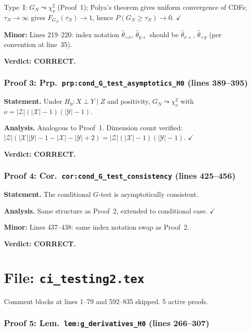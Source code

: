 \documentclass{article}
\begin{document}
Type~I: $G_N\leadsto\chi^2_\nu$ (Proof~1); Polya's theorem gives uniform
convergence of CDFs; $\tau_N\to\infty$ gives $F_{G_N}(\tau_N)\to 1$,
hence $P(G_N\ge\tau_N)\to 0$.  $\checkmark$

\textbf{Minor:} Lines 219--220: index notation $\hat\theta_{+x}$,
$\hat\theta_{y+}$ should be $\hat\theta_{x+}$, $\hat\theta_{+y}$
(per convention at line~35).

\textbf{Verdict: CORRECT.}

\section{Proof 3: Prp.\ \texttt{prp:cond\_G\_test\_asymptotics\_H0}
(lines 389--395)}

\textbf{Statement.} Under $H_0:X\perp Y\mid Z$ and positivity,
$G_N\leadsto\chi^2_\nu$ with $\nu=|\mathcal{Z}|(|\mathcal{X}|-1)(|\mathcal{Y}|-1)$.

\textbf{Analysis.}
Analogous to Proof~1.  Dimension count verified:
$|\mathcal{Z}|(|\mathcal{X}||\mathcal{Y}|-1-|\mathcal{X}|-|\mathcal{Y}|+2)
= |\mathcal{Z}|(|\mathcal{X}|-1)(|\mathcal{Y}|-1)$.  $\checkmark$

\textbf{Verdict: CORRECT.}

\section{Proof 4: Cor.\ \texttt{cor:cond\_G\_test\_consistency}
(lines 425--456)}

\textbf{Statement.} The conditional $G$-test is asymptotically consistent.

\textbf{Analysis.}
Same structure as Proof~2, extended to conditional case.  $\checkmark$

\textbf{Minor:} Lines 437--438: same index notation swap as Proof~2.

\textbf{Verdict: CORRECT.}

\part*{File: \texttt{ci\_testing2.tex}}

Comment blocks at lines 1--79 and 592--835 skipped.
5 active proofs.

\section{Proof 5: Lem.\ \texttt{lem:g\_derivatives\_H0} (lines 266--307)}
\end{document}

